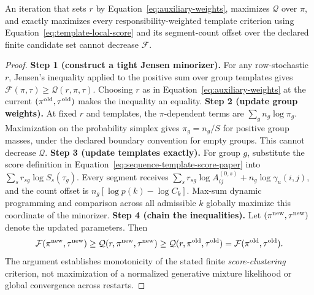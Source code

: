 \begin{theorem}
\label{thm:template-monotonicity-paper}
An iteration that sets $r$ by Equation~\eqref{eq:auxiliary-weights}, maximizes $\mathcal Q$ over $\pi$, and exactly maximizes every responsibility-weighted template criterion using Equation~\eqref{eq:template-local-score} and its segment-count offset over the declared finite candidate set cannot decrease $\mathcal F$.
\end{theorem}
\begin{proof}
\textbf{Step 1 (construct a tight Jensen minorizer).}
For any row-stochastic $r$, Jensen's inequality applied to the positive sum over group templates gives $\mathcal F(\pi,\tau)\ge\mathcal Q(r,\pi,\tau)$. Choosing $r$ as in Equation~\eqref{eq:auxiliary-weights} at the current $(\pi^{\rm old},\tau^{\rm old})$ makes the inequality an equality.
\textbf{Step 2 (update group weights).}
At fixed $r$ and templates, the $\pi$-dependent terms are $\sum_gn_g\log\pi_g$. Maximization on the probability simplex gives $\pi_g=n_g/S$ for positive group masses, under the declared boundary convention for empty groups. This cannot decrease $\mathcal Q$.
\textbf{Step 3 (update templates exactly).}
For group $g$, substitute the score definition in Equation~\eqref{eq:sequence-template-score-paper} into $\sum_sr_{sg}\log S_s(\tau_g)$. Every segment receives $\sum_sr_{sg}\log A^{(0,s)}_{ij}+n_g\log\gamma_u(i,j)$, and the count offset is $n_g[\log p(k)-\log C_k]$. Max-sum dynamic programming and comparison across all admissible $k$ globally maximize this coordinate of the minorizer.
\textbf{Step 4 (chain the inequalities).}
Let $(\pi^{\rm new},\tau^{\rm new})$ denote the updated parameters. Then
\[
\mathcal F(\pi^{\rm new},\tau^{\rm new})
\ge\mathcal Q(r,\pi^{\rm new},\tau^{\rm new})
\ge\mathcal Q(r,\pi^{\rm old},\tau^{\rm old})
=\mathcal F(\pi^{\rm old},\tau^{\rm old}).
\]
The argument establishes monotonicity of the stated finite \emph{score-clustering} criterion, not maximization of a normalized generative mixture likelihood or global convergence across restarts.
\end{proof}


